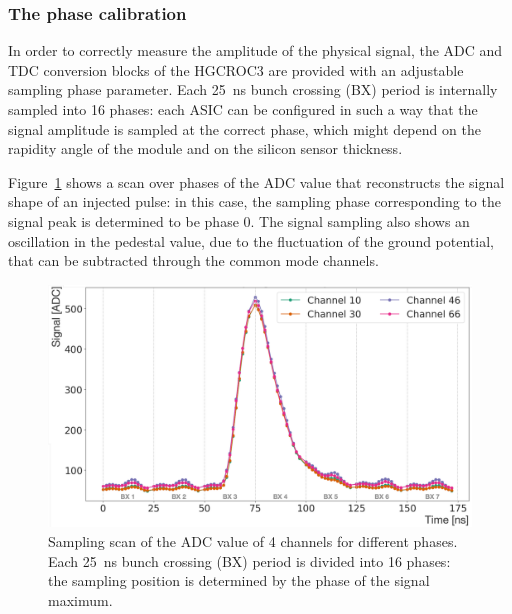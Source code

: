 
\subsubsection{The phase calibration}
\label{subsubsec:The phase calibration}

In order to correctly measure the amplitude of the physical signal, the ADC and TDC conversion blocks of the HGCROC3 are provided with an adjustable sampling phase parameter.
Each 25~ns bunch crossing (BX) period is internally sampled into 16 phases: each ASIC can be configured in such a way that the signal amplitude is sampled at the correct phase, which might depend on the rapidity angle of the module and on the silicon sensor thickness.

Figure~\ref{fig:BestPhase} shows a scan over phases of the ADC value that reconstructs the signal shape of an injected pulse: in this case, the sampling phase corresponding to the signal peak is determined to be phase 0.
The signal sampling also shows an oscillation in the pedestal value, due to the fluctuation of the ground potential, that can be subtracted through the common mode channels.

\begin{figure}[b!]
    \centering
    \includegraphics[width=0.65\linewidth]{Figures/HGCAL/BestPhase.pdf}
    \caption{Sampling scan of the ADC value of 4 channels for different phases. Each 25~ns bunch crossing (BX) period is divided into 16 phases: the sampling position is determined by the phase of the signal maximum.}
    \label{fig:BestPhase}
\end{figure}

